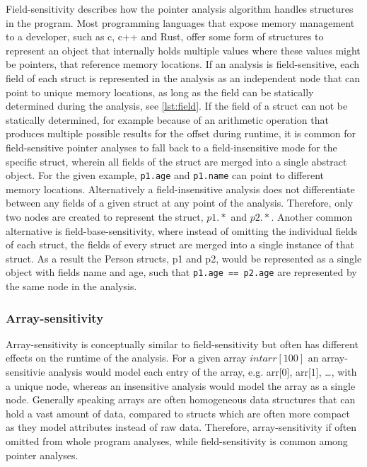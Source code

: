 Field-sensitivity describes how the pointer analysis algorithm handles structures in the program.
Most programming languages that expose memory management to a developer, such as c, c++ and Rust, offer some form of structures to represent an object that internally holds multiple values where these values might be pointers, that reference memory locations.
If an analysis is field-sensitive, each field of each struct is represented in the analysis as an independent node that can point to unique memory locations, as long as the field can be statically determined during the analysis, see \autoref{lst:field}.
If the field of a struct can not be statically determined, for example because of an arithmetic operation that produces multiple possible results for the offset during runtime, it is common for field-sensitive pointer analyses to fall back to a field-insensitive mode for the specific struct, wherein all fields of the struct are merged into a single abstract object.
For the given example, \verb|p1.age| and \verb|p1.name| can point to different memory locations.
Alternatively a field-insensitive analysis does not differentiate between any fields of a given struct at any point of the analysis.
Therefore, only two nodes are created to represent the struct, $p1.*$ and $p2.*$.
Another common alternative is field-base-sensitivity, where instead of omitting the individual fields of each struct, the fields of every struct are merged into a single instance of that struct.
As a result the Person structs, p1 and p2, would be represented as a single object with fields name and age, such that \verb|p1.age == p2.age| are represented by the same node in the analysis.

\subsubsection{Array-sensitivity}
Array-sensitivity is conceptually similar to field-sensitivity but often has different effects on the runtime of the analysis.
For a given array $int arr[100]$ an array-sensitivie analysis would model each entry of the array, \newline e.g. arr[0], arr[1], \dots, with a unique node, whereas an insensitive analysis would model the array as a single node.
Generally speaking arrays are often homogeneous data structures that can hold a vast amount of data, compared to structs which are often more compact as they model attributes instead of raw data.
Therefore, array-sensitivity if often omitted from whole program analyses, while field-sensitivity is common among pointer analyses.

